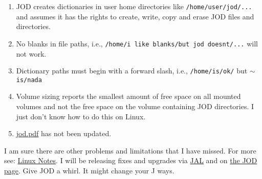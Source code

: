\begin{enumerate}
\tightlist
\item
  JOD creates dictionaries in user home directories like
  \texttt{/home/user/jod/...} and assumes it has the rights to create,
  write, copy and erase JOD files and directories.
\item
  No blanks in file paths, i.e., \texttt{/home/i like blanks/but jod doesnt/...}
  will not work.
\item
  Dictionary paths must begin with a forward slash, i.e., \texttt{/home/is/ok/}
  but \ensuremath{\sim}\texttt{is/nada}
\item
  Volume sizing reports the smallest amount of free space on all mounted
  volumes and not the free space on the volume containing JOD
  directories. I just don't know how to do this on Linux.
\item
  \href{http://www.box.net/shared/gajfu50gc0}{jod.pdf} has not been
  updated.
\end{enumerate}
I am sure there are other problems and limitations that I have missed.
For more see:
\href{https://docs.google.com/document/d/18pwvvpeuJiU\_HCsuReiKyOxmZORrlMRe45OYE\_cWq0w/edit?hl=en\_US}{Linux
Notes}. I will be releasing fixes and upgrades via
\href{http://www.jsoftware.com/jwiki/JAL/User\%20Guide}{JAL} and on
\href{http://bakerjd99.wordpress.com/the-jod-page/}{the JOD page}. Give
JOD a whirl. It might change your J ways.


%


%